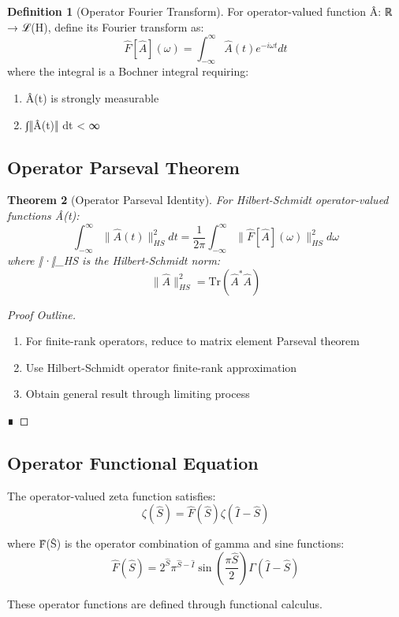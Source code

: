 \documentclass[12pt]{article}
\theoremstyle{plain}
\newtheorem{theorem}{Theorem}[section]
\theoremstyle{definition}
\newtheorem{definition}[theorem]{Definition}
\begin{document}
\begin{definition}[Operator Fourier Transform]
For operator-valued function Â: ℝ → ℒ(H), define its Fourier transform as:
$$\hat{F}[\hat{A}](\omega) = \int_{-\infty}^{\infty} \hat{A}(t) e^{-i\omega t} dt$$
where the integral is a Bochner integral requiring:
\begin{enumerate}
\item Â(t) is strongly measurable
\item ∫‖Â(t)‖ dt < ∞
\end{enumerate}
\end{definition}

\subsection{Operator Parseval Theorem}

\begin{theorem}[Operator Parseval Identity]
For Hilbert-Schmidt operator-valued functions Â(t):
$$\int_{-\infty}^{\infty} \|\hat{A}(t)\|_{HS}^2 dt = \frac{1}{2\pi} \int_{-\infty}^{\infty} \|\hat{F}[\hat{A}](\omega)\|_{HS}^2 d\omega$$
where ‖·‖_{HS} is the Hilbert-Schmidt norm:
$$\|\hat{A}\|_{HS}^2 = \text{Tr}(\hat{A}^* \hat{A})$$
\end{theorem}

\begin{proof}[Proof Outline]
\begin{enumerate}
\item For finite-rank operators, reduce to matrix element Parseval theorem
\item Use Hilbert-Schmidt operator finite-rank approximation
\item Obtain general result through limiting process
\end{enumerate} ∎
\end{proof}

\subsection{Operator Functional Equation}

The operator-valued zeta function satisfies:
$$\zeta(\hat{S}) = \hat{F}(\hat{S}) \zeta(\hat{I} - \hat{S})$$

where F̂(Ŝ) is the operator combination of gamma and sine functions:
$$\hat{F}(\hat{S}) = 2^{\hat{S}} \pi^{\hat{S}-\hat{I}} \sin\left(\frac{\pi \hat{S}}{2}\right) \Gamma(\hat{I} - \hat{S})$$

These operator functions are defined through functional calculus.
\end{document}
